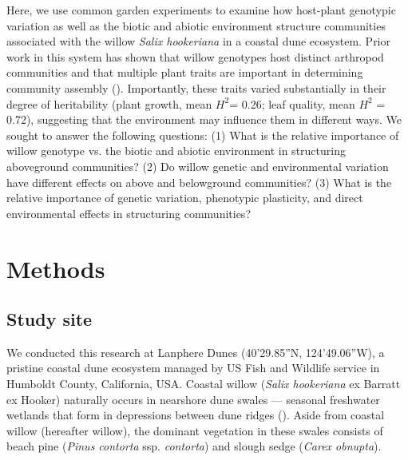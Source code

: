 \documentclass[11pt]{article}
\begin{document}
Here, we use common garden experiments to examine how host-plant
genotypic variation as well as the biotic and abiotic environment
structure communities associated with the willow \emph{Salix hookeriana}
in a coastal dune ecosystem. Prior work in this system has shown that
willow genotypes host distinct arthropod communities and that multiple
plant traits are important in determining community assembly
(\citealt{Barbour_2015, Barbour_2016}). Importantly, these traits varied
substantially in their degree of heritability (plant growth, mean
\(H^2\)= 0.26; leaf quality, mean \(H^2\) = 0.72),
suggesting that the environment may influence them in different ways. We
sought to answer the following questions: (1) What is the relative
importance of willow genotype vs. the biotic and abiotic environment in
structuring aboveground communities? (2) Do willow genetic and
environmental variation have different effects on above and belowground
communities? (3) What is the relative importance of genetic
variation, phenotypic plasticity, and direct environmental effects in
structuring communities?


\section*{Methods}

\subsection*{Study site}

We conducted this research at Lanphere Dunes (40'29.85''N,
124'49.06''W), a pristine coastal dune ecosystem managed by
US Fish and Wildlife service in Humboldt County, California, USA.
Coastal willow (\emph{Salix hookeriana} ex Barratt ex Hooker) naturally
occurs in nearshore dune swales --- seasonal freshwater wetlands that
form in depressions between dune ridges (\citealt{pickart2007beach}). Aside from
coastal willow (hereafter willow), the dominant vegetation in these
swales consists of beach pine (\emph{Pinus contorta} ssp.
\emph{contorta}) and slough sedge (\emph{Carex obnupta}).
\end{document}
